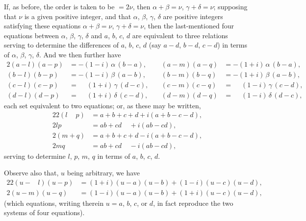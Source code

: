 \documentclass[11pt,a4paper]{article}
\theoremstyle{plain}
\theoremstyle{definition}
\begin{document}
If, as before, the order is taken to be $=2\nu$, then $\alpha+\beta = \nu$, $\gamma+\delta = \nu$; supposing that $\nu$ is a given positive integer, and that $\alpha$, $\beta$, $\gamma$, $\delta$ are positive integers satisfying these equations $\alpha+\beta = \nu$, $\gamma+\delta = \nu$, then the last-mentioned four equations between $\alpha$, $\beta$, $\gamma$, $\delta$ and $a$, $b$, $c$, $d$ are equivalent to three relations serving to determine the differences of $a$, $b$, $c$, $d$ (say $a-d$, $b-d$, $c-d$) in terms of $\alpha$, $\beta$, $\gamma$, $\delta$. And we then further have
\begin{alignat*}{2}
(a-l)(a-p) &= -(1-i)\,\alpha\, (b-a), &\quad (a-m)(a-q) &= -(1+i)\,\alpha\, (b-a), \\
(b-l)(b-p) &= -(1-i)\,\beta\, (a-b), &\quad (b-m)(b-q) &= -(1+i)\,\beta\, (a-b), \\
(c-l)(c-p) &= \phantom{-}(1+i)\,\gamma\, (d-c), &\quad (c-m)(c-q) &= \phantom{-}(1-i)\,\gamma\, (c-d), \\
(d-l)(d-p) &= \phantom{-}(1+i)\,\delta\, (c-d), &\quad (d-m)(d-q) &= \phantom{-}(1-i)\,\delta\, (d-c),
\end{alignat*}
each set equivalent to two equations; or, as these may be written,
\begin{alignat*}{2}
2(l\phantom{+}p) &= a+b+c+d + i(a+b-c-d), \\
2lp\phantom{)} &= ab+cd \phantom{+ i} + i(ab-cd), \\
2(m+q) &= a+b+c+d - i(a+b-c-d), \\
2mq\phantom{)} &= ab+cd \phantom{+ i} - i(ab-cd),
\end{alignat*}
serving to determine $l$, $p$, $m$, $q$ in terms of $a$, $b$, $c$, $d$.

Observe also that, $u$ being arbitrary, we have
\begin{alignat*}{2}
2(u-\phantom{m}l)(u-p) &= (1+i)(u-a)(u-b) + (1-i)(u-c)(u-d), \\
2(u-m)(u-q) &= (1-i)(u-a)(u-b) + (1+i)(u-c)(u-d),
\end{alignat*}
(which equations, writing therein $u=a$, $b$, $c$, or $d$, in fact reproduce the two systems of four equations).
\end{document}
